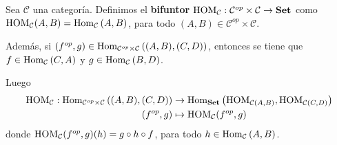 \documentclass[12pt]{report}
\theoremstyle{largebreak}
\newcommand\cf[3]{\ensuremath{#1:#2\rightarrow#3}}
\newcommand{\Hom}[3]{\ensuremath{\textup{Hom}_{#1}\left(#2,#3\right)}}
\newcommand{\Cat}[1]{\ensuremath{\textup{\textbf{#1}}}}
\begin{document}
    \newcommand{\HOM}[1]{\ensuremath{\textup{HOM}_{#1}}}

    \begin{mydef}
        Sea $\mathcal{C}$ una categoría. Definimos el \textbf{bifuntor} $\cf{\HOM{\mathcal{C}}}{\mathcal{C}^{op}\times \mathcal{C}}{\Cat{Set}}$ como $\HOM{\mathcal{C}}(A,B)=\Hom{\mathcal{C}}{A}{B}$, para todo $(A,B)\in\mathcal{C}^{op}\times\mathcal{C}$.
        
        Además, si $(f^{op},g)\in\Hom{\mathcal{C}^{op}\times\mathcal{C}}{(A,B)}{(C,D)}$, entonces se tiene que $f\in\Hom{\mathcal{C}}{C}{A}$ y $g\in\Hom{\mathcal{C}}{B}{D}$.

        Luego
        \begin{equation*}
            \begin{split}
                \HOM{\mathcal{C}}:\Hom{\mathcal{C}^{op}\times\mathcal{C}}{(A,B)}{(C,D)}&\rightarrow \Hom{\Cat{Set}}{\HOM{\mathcal{C}(A,B)}}{\HOM{\mathcal{C}(C,D)}}\\
                (f^{op},g)&\mapsto \HOM{\mathcal{C}}(f^{op},g)
            \end{split}
        \end{equation*}
        donde $\HOM{\mathcal{C}}(f^{op},g)(h)=g\circ h\circ f$, para todo $h\in\Hom{\mathcal{C}}{A}{B}$.
    \end{mydef}
\end{document}
